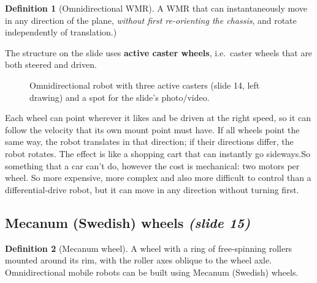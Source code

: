 \documentclass[11pt,a4paper]{article}
\theoremstyle{definition}
\newtheorem{definition}{Definition}[section]
\theoremstyle{plain}
\newcommand{\casterwheel}[2]{\begin{scope}[shift={(#1)},rotate=#2]
  \draw (0,0)--(-0.4,0); \draw[fill=white] (-0.6,-0.06) rectangle (-0.2,0.06);
  \fill (0,0) circle (1.5pt);\end{scope}}
\begin{document}
\begin{definition}[Omnidirectional WMR]
A WMR that can instantaneously move in any direction of the plane, \emph{without first re-orienting the chassis}, and rotate independently of translation.)
\end{definition}

The structure on the slide uses \textbf{active caster wheels}, i.e.\ caster wheels that are both steered and driven.

\begin{figure}[H]
\centering
{}
\caption{Omnidirectional robot with three active casters (slide 14, left drawing) and a spot for the slide's photo/video.}
\end{figure}

\begin{intuition}
Each wheel can point wherever it likes and be driven at the right speed, so it can follow the velocity that its own mount point must have. If all wheels point the same way, the robot translates in that direction; if their directions differ, the robot rotates. The effect is like a shopping cart that can instantly go sideways.So something that a car can't do, however the cost is mechanical: two motors per wheel. So more expensive, more complex and also more difficult to control than a differential-drive robot, but it can move in any direction without turning first.
\end{intuition}

\subsection{Mecanum (Swedish) wheels \emph{(slide 15)}}

\begin{definition}[Mecanum wheel]
A wheel with a ring of free-spinning rollers mounted around its rim, with the roller axes oblique to the wheel axle. Omnidirectional mobile robots can be built using Mecanum (Swedish) wheels.
\end{definition}
\end{document}
